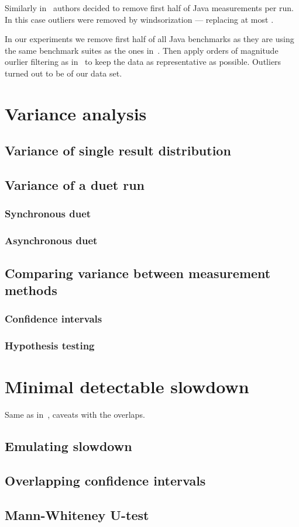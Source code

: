 Similarly in~\citet{bulej2020duet} authors decided to remove first half of Java measurements per run.
In this case outliers were removed by windsorization --- replacing at most .

In our experiments we remove first half of all Java benchmarks as they are using the same benchmark suites as the ones in~\citet{bulej2020duet}.
Then apply orders of magnitude ourlier filtering as in~\citet{laaber2019software} to keep the data as representative as possible.
Outliers turned out to be  of our data set.

\section{Variance analysis}



\subsection{Variance of single result distribution}

\subsection{Variance of a duet run}

\subsubsection{Synchronous duet}

\subsubsection{Asynchronous duet}

\subsection{Comparing variance between measurement methods}

\subsubsection{Confidence intervals}

\subsubsection{Hypothesis testing}

\section{Minimal detectable slowdown}
\label{sec:mds}

Same as in~\citet{laaber2019software}, caveats with the overlaps.

\subsection{Emulating slowdown}

\subsection{Overlapping confidence intervals}

\subsection{Mann-Whiteney U-test}
